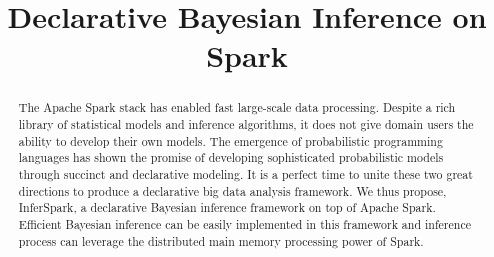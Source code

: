 \documentclass{sig-alternate-05-2015}
\newcommand\Mark[1]{\textsuperscript{#1}}
\begin{document}

\title{Declarative Bayesian Inference on Spark}


\maketitle


\begin{abstract}
The Apache Spark stack has enabled fast
large-scale data processing.
Despite a rich library of statistical models and
inference algorithms, it does not give domain
users the ability to develop their own models.
The emergence of probabilistic programming languages 
has shown the promise of developing sophisticated
probabilistic models through succinct and declarative modeling.
It is a perfect time to unite these two great directions to
produce a declarative big data analysis framework. 
We thus propose, InferSpark, a declarative Bayesian inference
framework on top of Apache Spark. 
Efficient Bayesian inference can be easily implemented in this 
framework and inference process can leverage the distributed 
main memory processing power of Spark. 
\end{abstract}


%


%


%


{
\scriptsize


}

\end{document}
